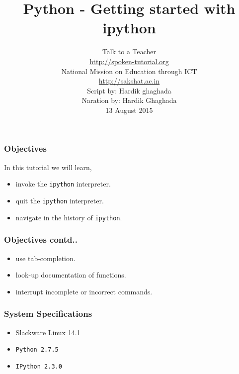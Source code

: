 \documentclass[17pt,compress]{beamer}
\author[FOSSEE]{}
\institute[IIT Bombay]{}
\date[]{}
\begin{document}
\sffamily \bfseries
\title
[Getting started with ipython]
{Python - Getting started with ipython}
\author
[FOSSEE, IIT - Bombay]
{\small Talk to a Teacher\\{\color{blue}\url{http://spoken-tutorial.org}}\\National Mission on Education
 through ICT\\{\color{blue}\url{http://sakshat.ac.in}} \\[0.5cm]{\tiny Script by: Hardik ghaghada \\ Naration by: Hardik Ghaghada \\ 13 August 2015}}

\begin{frame}
   \titlepage
\end{frame}
\begin{frame}
\frametitle{Objectives}
In this tutorial we will learn,\pause
\begin{itemize}
\item invoke the \texttt{ipython} interpreter.\pause
\item quit the \texttt{ipython} interpreter.\pause
\item navigate in the history of \texttt{ipython}.
\end{itemize}
\end{frame}
\begin{frame}
\frametitle{Objectives contd..}
\begin{itemize}
\item use tab-completion.\pause
\item look-up documentation of functions.\pause
\item interrupt incomplete or incorrect commands.
\end{itemize}
\end{frame}
\begin{frame}
\frametitle{System Specifications}\pause
\begin{itemize}
\item Slackware Linux 14.1\pause
\item \texttt{Python 2.7.5} \pause
\item \texttt{IPython 2.3.0}
\end{itemize}
\end{frame}
\end{document}
